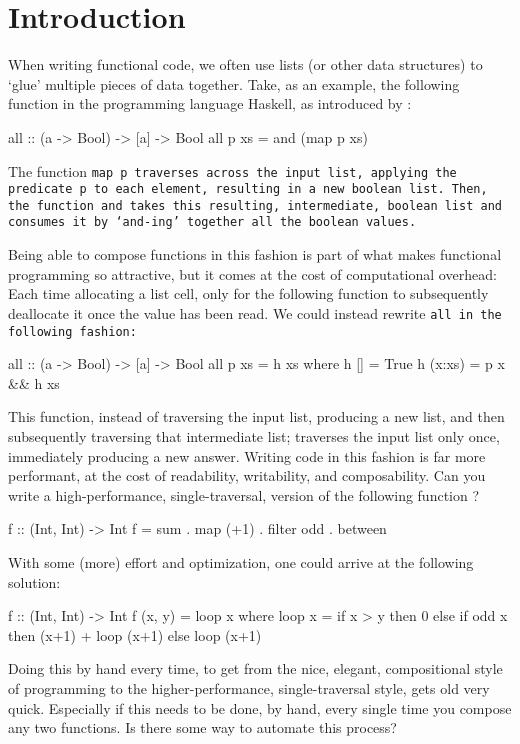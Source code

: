 \section{Introduction}
When writing functional code, we often use lists (or other data structures) to `glue' multiple pieces of data together.
Take, as an example, the following function in the programming language Haskell, as introduced by \cite{Gill1993}: %
\begin{code}
all :: (a -> Bool) -> [a] -> Bool
all p xs = and (map p xs)
\end{code}
The function \tt{map p} traverses across the input list, applying the predicate \tt{p} to each element, resulting in a new boolean list.
Then, the function \tt{and} takes this resulting, intermediate, boolean list and consumes it by `and-ing' together all the boolean values.

Being able to compose functions in this fashion is part of what makes functional programming so attractive, but it comes at the cost of computational overhead:
Each time allocating a list cell, only for the following function to subsequently deallocate it once the value has been read.
We could instead rewrite \tt{all} in the following fashion:
\begin{code}
all :: (a -> Bool) -> [a] -> Bool
all p xs = h xs
  where h []     = True
        h (x:xs) = p x && h xs
\end{code}
This function, instead of traversing the input list, producing a new list, and then subsequently traversing that intermediate list; traverses the input list only once, immediately producing a new answer.
Writing code in this fashion is far more performant, at the cost of readability, writability, and composability.
Can you write a high-performance, single-traversal, version of the following function \citep{Harper2011}?
\begin{code}
f :: (Int, Int) -> Int
f = sum . map (+1) . filter odd . between
\end{code}
With some (more) effort and optimization, one could arrive at the following solution:
\begin{code}
f :: (Int, Int) -> Int
f (x, y) = loop x
  where loop x = if x > y
                 then 0
                 else if odd x
                      then (x+1) + loop (x+1)
                      else loop (x+1)
\end{code}
Doing this by hand every time, to get from the nice, elegant, compositional style of programming to the higher-performance, single-traversal style, gets old very quick.
Especially if this needs to be done, by hand, every single time you compose any two functions.
Is there some way to automate this process?


